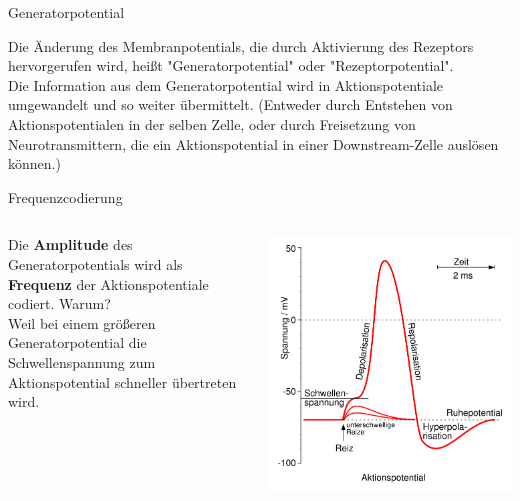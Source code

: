 \documentclass[aspectratio=169]{beamer}
\begin{document}
\begin{frame}{Generatorpotential}

Die Änderung des Membranpotentials, die durch Aktivierung des Rezeptors hervorgerufen wird, heißt "Generatorpotential" oder "Rezeptorpotential". \\[0.5 cm]

Die Information aus dem Generatorpotential wird in Aktionspotentiale umgewandelt und so weiter übermittelt. (Entweder durch Entstehen von Aktionspotentialen in der selben Zelle, oder durch Freisetzung von Neurotransmittern, die ein Aktionspotential in einer Downstream-Zelle auslösen können.) 


\end{frame}





\begin{frame}{Frequenzcodierung}

\begin{columns}
\begin{column}{7cm}

Die \textbf{Amplitude} des Generatorpotentials wird als \textbf{Frequenz} der Aktionspotentiale codiert. Warum? \\[0.2 cm]


Weil bei einem größeren Generatorpotential die Schwellenspannung zum Aktionspotential schneller übertreten wird. 
\end{column}

\begin{column}{7cm}
\includegraphics[width=\textwidth]{Aktionspotential.png}
\end{column}

\end{columns}

\end{frame}
\end{document}
